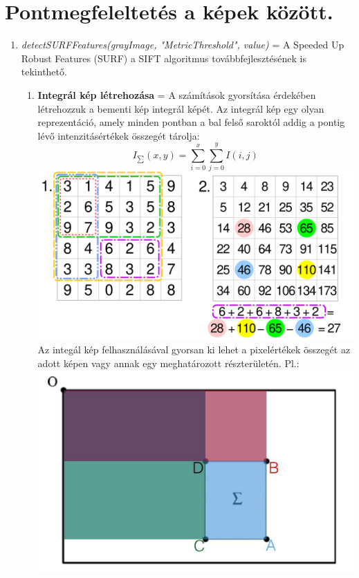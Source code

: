 \documentclass[12pt]{report}
\begin{document}
            \section{Pontmegfeleltetés a képek között.}
                \begin{enumerate}
                    \item \textit{detectSURFFeatures(grayImage, "MetricThreshold", value)} = A Speeded Up Robust Features (SURF) a SIFT algoritmus továbbfejlesztésének is tekinthető. \\
                    \begin{enumerate}
                        \item \textbf{Integrál kép létrehozása} = A számítások gyorsítása érdekében létrehozzuk a bementi kép integrál képét. Az integrál kép egy olyan reprezentáció, amely minden pontban a bal felső saroktól addig a pontig lévő intenzitásértékek összegét tárolja: \\
                        \[I_{\sum}(x, y) = \sum_{i=0}^{x} \sum_{j=0}^{y} I(i, j)\]
                        \includegraphics[scale=0.2]{integral_image.png}\\
                        Az integál kép felhasználásával gyorsan ki lehet a pixelértékek összegét az adott képen vagy annak egy meghatározott részterületén. Pl.:\\
                        \includegraphics[scale=0.4]{Summed_area_table.png}\\

\end{enumerate}
\end{enumerate}
\end{document}
